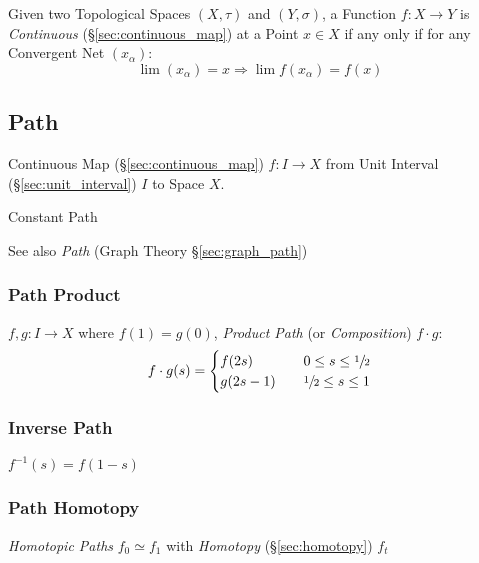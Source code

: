 Given two Topological Spaces $(X,\tau)$ and $(Y,\sigma)$, a Function
$f : X \rightarrow Y$ is \emph{Continuous}
(\S\ref{sec:continuous_map}) at a Point $x \in X$ if any only if for
any Convergent Net $(x_\alpha)$:
\[
  \lim (x_\alpha) = x \Rightarrow \lim f(x_\alpha) = f(x)
\]



\subsection{Path}\label{sec:path} \cite{hatcher02}

Continuous Map (\S\ref{sec:continuous_map}) $f : I \rightarrow X$ from
Unit Interval (\S\ref{sec:unit_interval}) $I$ to Space $X$.

Constant Path %

\fist See also \emph{Path} (Graph Theory \S\ref{sec:graph_path})



\subsubsection{Path Product}\label{sec:path_product}

$f,g : I \rightarrow X$ where $f(1) = g(0)$, \emph{Product Path} (or
\emph{Composition}) $f \cdot g$:
\[
  f \cdot g (s) =
  \begin{cases}
    f(2s)   & \quad 0 \leq s \leq \sfrac{1}{2} \\
    g(2s-1) & \quad \sfrac{1}{2} \leq s \leq 1 \\
  \end{cases}
\]



\subsubsection{Inverse Path}\label{sec:inverse_path}

$f^{-1}(s) = f(1-s)$



\subsubsection{Path Homotopy}\label{sec:path_homotopy}

\emph{Homotopic Paths} $f_0 \simeq f_1$ with \emph{Homotopy}
(\S\ref{sec:homotopy}) $f_t$

